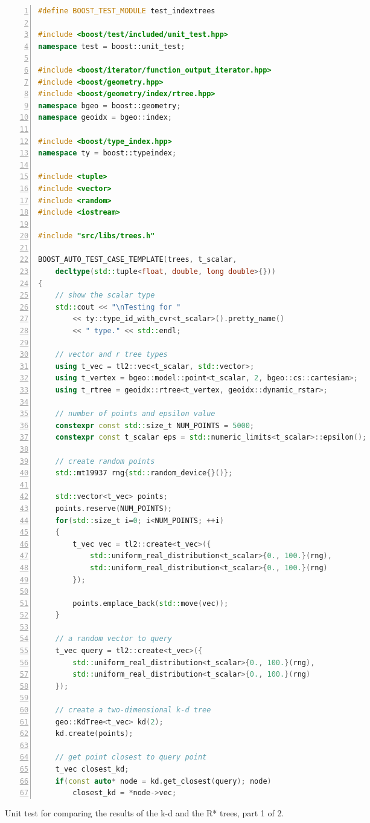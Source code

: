 \begin{listing}[htb]
	\begin{lstlisting}[language = C++,
			basicstyle = {\scriptsize},
			breaklines = true, tabsize = 4,
			numbers = left, numberstyle={\scriptsize}]
#define BOOST_TEST_MODULE test_indextrees

#include <boost/test/included/unit_test.hpp>
namespace test = boost::unit_test;

#include <boost/iterator/function_output_iterator.hpp>
#include <boost/geometry.hpp>
#include <boost/geometry/index/rtree.hpp>
namespace bgeo = boost::geometry;
namespace geoidx = bgeo::index;

#include <boost/type_index.hpp>
namespace ty = boost::typeindex;

#include <tuple>
#include <vector>
#include <random>
#include <iostream>

#include "src/libs/trees.h"

BOOST_AUTO_TEST_CASE_TEMPLATE(trees, t_scalar,
	decltype(std::tuple<float, double, long double>{}))
{
	// show the scalar type
	std::cout << "\nTesting for "
		<< ty::type_id_with_cvr<t_scalar>().pretty_name()
		<< " type." << std::endl;

	// vector and r tree types
	using t_vec = tl2::vec<t_scalar, std::vector>;
	using t_vertex = bgeo::model::point<t_scalar, 2, bgeo::cs::cartesian>;
	using t_rtree = geoidx::rtree<t_vertex, geoidx::dynamic_rstar>;

	// number of points and epsilon value
	constexpr const std::size_t NUM_POINTS = 5000;
	constexpr const t_scalar eps = std::numeric_limits<t_scalar>::epsilon();

	// create random points
	std::mt19937 rng{std::random_device{}()};

	std::vector<t_vec> points;
	points.reserve(NUM_POINTS);
	for(std::size_t i=0; i<NUM_POINTS; ++i)
	{
		t_vec vec = tl2::create<t_vec>({
			std::uniform_real_distribution<t_scalar>{0., 100.}(rng),
			std::uniform_real_distribution<t_scalar>{0., 100.}(rng)
		});

		points.emplace_back(std::move(vec));
	}

	// a random vector to query
	t_vec query = tl2::create<t_vec>({
		std::uniform_real_distribution<t_scalar>{0., 100.}(rng),
		std::uniform_real_distribution<t_scalar>{0., 100.}(rng)
	});

	// create a two-dimensional k-d tree
	geo::KdTree<t_vec> kd(2);
	kd.create(points);

	// get point closest to query point
	t_vec closest_kd;
	if(const auto* node = kd.get_closest(query); node)
		closest_kd = *node->vec;
	\end{lstlisting}
	\caption[Unit test 1/2.]{Unit test for comparing the results of the k-d and the R* trees, part 1 of 2.
	\label{lst:unit_test}}
\end{listing}



